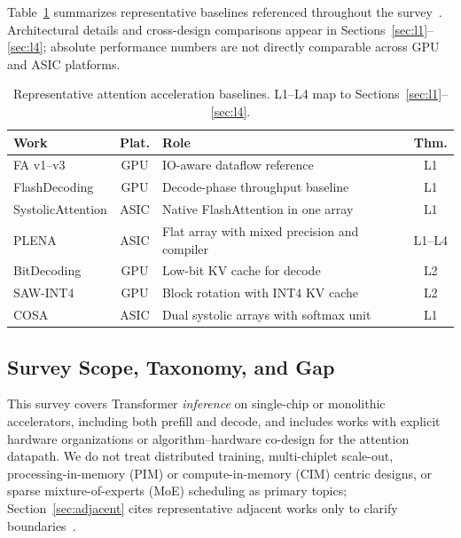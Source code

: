 \documentclass[conference]{IEEEtran}
\begin{document}
Table~\ref{tab:baselines} summarizes representative baselines referenced throughout the survey~\cite{dao2022flashattention,dao2023flashattention2,shah2024flashattention3,dao2023flashdecoding,lin2025systolicattention,plena2025,bitdecoding2026,sawint42026,wang2023cosa}.
Architectural details and cross-design comparisons appear in Sections~\ref{sec:l1}--\ref{sec:l4}; absolute performance numbers are not directly comparable across GPU and ASIC platforms.

\begin{table}[t]
\caption{Representative attention acceleration baselines.
L1--L4 map to Sections~\ref{sec:l1}--\ref{sec:l4}.}
\label{tab:baselines}
\centering
\footnotesize
\setlength{\tabcolsep}{4pt}
\begin{tabularx}{\columnwidth}{@{}l c >{\raggedright\arraybackslash}X c@{}}
\hline
\textbf{Work} & \textbf{Plat.} & \textbf{Role} & \textbf{Thm.} \\
\hline
FA v1--v3 & GPU & IO-aware dataflow reference & L1 \\
FlashDecoding & GPU & Decode-phase throughput baseline & L1 \\
SystolicAttention & ASIC & Native FlashAttention in one array & L1 \\
PLENA & ASIC & Flat array with mixed precision and compiler & L1--L4 \\
BitDecoding & GPU & Low-bit KV cache for decode & L2 \\
SAW-INT4 & GPU & Block rotation with INT4 KV cache & L2 \\
COSA & ASIC & Dual systolic arrays with softmax unit & L1 \\
\hline
\end{tabularx}
\end{table}

\subsection{Survey Scope, Taxonomy, and Gap}
\label{sec:intro-scope}

This survey covers Transformer \emph{inference} on single-chip or monolithic accelerators, including both prefill and decode, and includes works with explicit hardware organizations or algorithm--hardware co-design for the attention datapath.
We do not treat distributed training, multi-chiplet scale-out, processing-in-memory (PIM) or compute-in-memory (CIM) centric designs, or sparse mixture-of-experts (MoE) scheduling as primary topics; Section~\ref{sec:adjacent} cites representative adjacent works only to clarify boundaries~\cite{salca2026,liu2021sanger,amma2026,lolpim2024,heo2024nuepim}.
\end{document}
